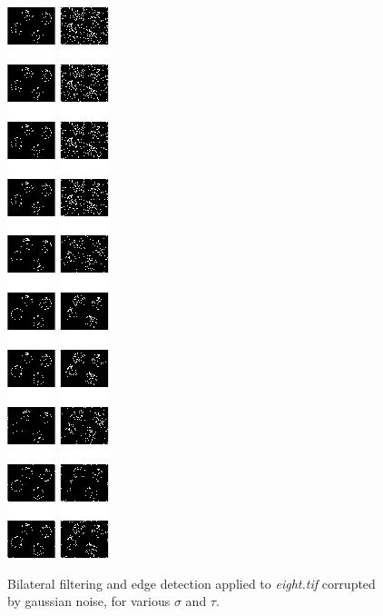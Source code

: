\documentclass[11pt]{report}
\begin{document}
\begin{figure}[h]
\includegraphics{A3_3_3.png}
\includegraphics{A3_3_4.png}
\caption{Bilateral filtering and edge detection applied to \textit{eight.tif} corrupted by gaussian noise, for various $\sigma$ and $\tau$.}
\end{figure}
\end{document}

